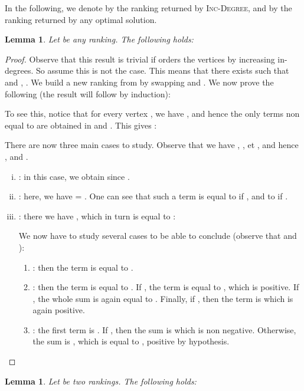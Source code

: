 \documentclass[11pt]{article}
\newtheorem{lemma}[theorem]{Lemma}
\begin{document}
In the following, we denote by  the ranking returned by \textsc{Inc-Degree}, and by  the ranking returned by any optimal solution.

\begin{lemma}
\label{lem:approxtwo}
Let  be any ranking. The following holds:

\end{lemma}

\begin{proof}
Observe that this result is trivial if  orders the vertices by increasing in-degrees. So assume this is not the case. This means that there exists  such that  and , . We build a new ranking  from  by swapping  and . We now prove the following (the result will follow by induction): 

To see this, notice that for every vertex , we have , and hence the only terms non equal to  are obtained in  and . This gives :

There are now three main cases to study. Observe that we have , ,  et , and hence ,  and . 

\begin{enumerate}[(i)]
	\item  : in this case, we obtain  since .
	\item  : here, we have  = . One can see that such a term is equal to  if , and to  if .
	\item  : there we have , which in turn is equal to :



We now have to study several cases to be able to conclude (observe that  and ):
\begin{enumerate}[(1)]
	\item  : then the term is equal to .
	\item  : then the term is equal to  . If , the term is equal to , which is positive. If , the whole sum is again equal to . Finally, if , then the term is  which is again positive.
	\item  : the first term is . If , then the sum is  which is non negative. Otherwise, the sum is , which is equal to , positive by hypothesis.
\end{enumerate}
\end{enumerate}
 \end{proof}

\begin{lemma}
\label{lem:approxthree}
Let  be two rankings. The following holds:

\end{lemma}
\end{document}
